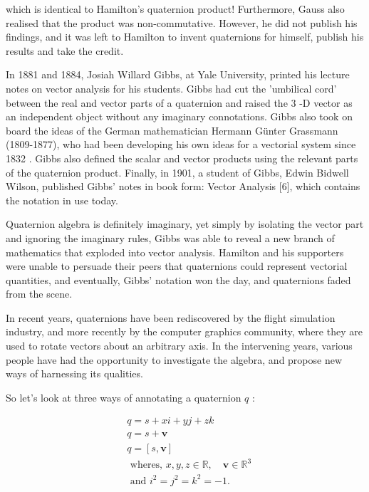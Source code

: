 which is identical to Hamilton's quaternion product! Furthermore, Gauss also realised that the product was non-commutative. However, he did not publish his findings, and it was left to Hamilton to invent quaternions for himself, publish his results and take the credit.

In 1881 and 1884, Josiah Willard Gibbs, at Yale University, printed his lecture notes on vector analysis for his students. Gibbs had cut the 'umbilical cord' between the real and vector parts of a quaternion and raised the 3 -D vector as an independent object without any imaginary connotations. Gibbs also took on board the ideas of the German mathematician Hermann Günter Grassmann (1809-1877), who had been developing his own ideas for a vectorial system since 1832 . Gibbs also defined the scalar and vector products using the relevant parts of the quaternion product. Finally, in 1901, a student of Gibbs, Edwin Bidwell Wilson, published Gibbs' notes in book form: Vector Analysis [6], which contains the notation in use today.

Quaternion algebra is definitely imaginary, yet simply by isolating the vector part and ignoring the imaginary rules, Gibbs was able to reveal a new branch of mathematics that exploded into vector analysis. Hamilton and his supporters were unable to persuade their peers that quaternions could represent vectorial quantities, and eventually, Gibbs' notation won the day, and quaternions faded from the scene.

In recent years, quaternions have been rediscovered by the flight simulation industry, and more recently by the computer graphics community, where they are used to rotate vectors about an arbitrary axis. In the intervening years, various people have had the opportunity to investigate the algebra, and propose new ways of harnessing its qualities.

So let's look at three ways of annotating a quaternion $q$ :

$$
    \begin{aligned}
         & q=s+x i+y j+z k                                                               \\
         & q=s+\mathbf{v}                                                                \\
         & q=[s, \mathbf{v}]                                                             \\
         & \text { wheres, } x, y, z \in \mathbb{R}, \quad \mathbf{v} \in \mathbb{R}^{3} \\
         & \text { and } i^{2}=j^{2}=k^{2}=-1 .
    \end{aligned}
$$

